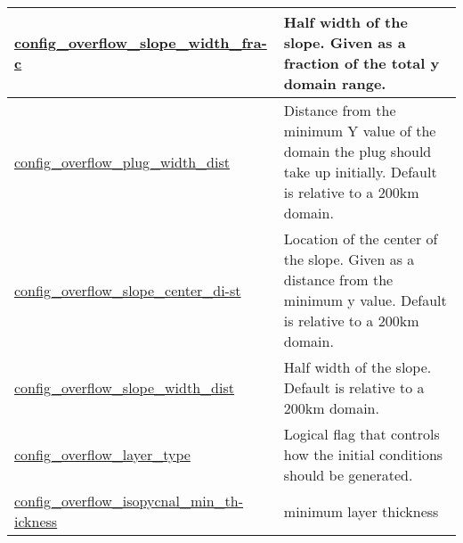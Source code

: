 {\begin{center}
\begin{longtable}{| p{2.0in} || p{4.0in} |}
    \hline
    \hyperref[subsec:nm_sec_config_overflow_slope_width_frac]{config\_overflow\_slope\_width\_fra-}\hyperref[subsec:nm_sec_config_overflow_slope_width_frac]{c}& Half width of the slope. Given as a fraction of the total y domain range. \\
    \hline
    \hyperref[subsec:nm_sec_config_overflow_plug_width_dist]{config\_overflow\_plug\_width\_dist} & Distance from the minimum Y value of the domain the plug should take up initially. Default is relative to a 200km domain. \\
    \hline
    \hyperref[subsec:nm_sec_config_overflow_slope_center_dist]{config\_overflow\_slope\_center\_di-}\hyperref[subsec:nm_sec_config_overflow_slope_center_dist]{st}& Location of the center of the slope. Given as a distance from the minimum y value. Default is relative to a 200km domain. \\
    \hline
    \hyperref[subsec:nm_sec_config_overflow_slope_width_dist]{config\_overflow\_slope\_width\_dist} & Half width of the slope. Default is relative to a 200km domain. \\
    \hline
    \hyperref[subsec:nm_sec_config_overflow_layer_type]{config\_overflow\_layer\_type} & Logical flag that controls how the initial conditions should be generated. \\
    \hline
    \hyperref[subsec:nm_sec_config_overflow_isopycnal_min_thickness]{config\_overflow\_isopycnal\_min\_th-}\hyperref[subsec:nm_sec_config_overflow_isopycnal_min_thickness]{ickness}& minimum layer thickness \\
    \hline
\end{longtable}
\end{center}
}
